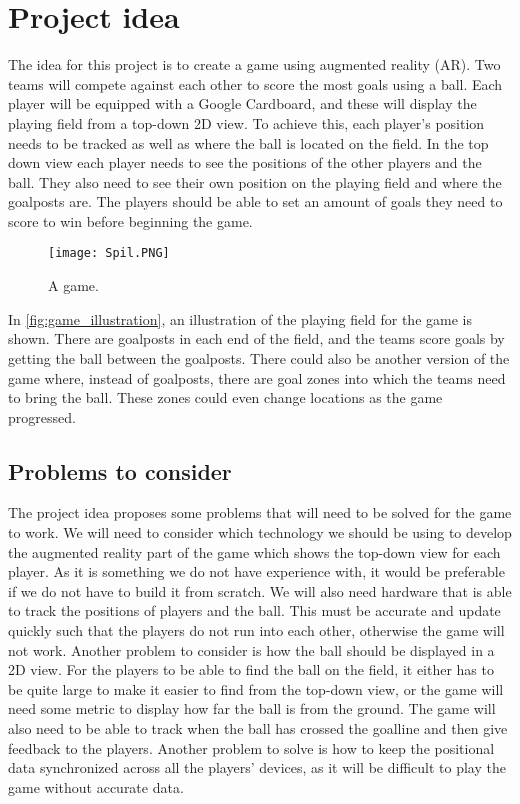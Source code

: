 \section{Project idea}
The idea for this project is to create a game using augmented reality (AR). 
Two teams will compete against each other to score the most goals using a ball. 
Each player will be equipped with a Google Cardboard, and these will display the playing field from a top-down 2D view. 
To achieve this, each player's position needs to be tracked as well as where the ball is located on the field.
In the top down view each player needs to see the positions of the other players and the ball.
They also need to see their own position on the playing field and where the goalposts are.
The players should be able to set an amount of goals they need to score to win before beginning the game. 
\begin{figure}[H]
    \centering
    \texttt{[image: Spil.PNG]}
    \caption{A game.}
    \label{fig:game_illustration}
\end{figure}
In \autoref{fig:game_illustration}, an illustration of the playing field for the game is shown.
There are goalposts in each end of the field, and the teams score goals by getting the ball between the goalposts.
There could also be another version of the game where, instead of goalposts, there are goal zones into which the teams need to bring the ball.
These zones could even change locations as the game progressed.
\subsection{Problems to consider}
The project idea proposes some problems that will need to be solved for the game to work.
We will need to consider which technology we should be using to develop the augmented reality part of the game which shows the top-down view for each player. 
As it is something we do not have experience with, it would be preferable if we do not have to build it from scratch.
We will also need hardware that is able to track the positions of players and the ball.
This must be accurate and update quickly such that the players do not run into each other, otherwise the game will not work.
Another problem to consider is how the ball should be displayed in a 2D view.
For the players to be able to find the ball on the field, it either has to be quite large to make it easier to find from the top-down view, or the game will need some metric to display how far the ball is from the ground.
The game will also need to be able to track when the ball has crossed the goalline and then give feedback to the players.
Another problem to solve is how to keep the positional data synchronized across all the players' devices, as it will be difficult to play the game without accurate data.
